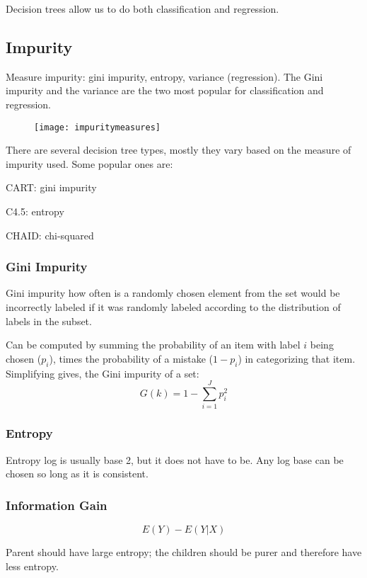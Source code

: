 Decision trees allow us to do both classification and regression.

	\subsection{Impurity}
Measure impurity: gini impurity, entropy, variance (regression).  The Gini impurity and the variance are the two most popular for classification and regression.

	\begin{figure}[tbp]
		\centering
		\texttt{[image: impuritymeasures]}
	\end{figure}

There are several decision tree types, mostly they vary based on the measure of impurity used.  Some popular ones are:
	\begin{bulletedlist}
		\item CART: gini impurity
		\item C4.5: entropy
		\item CHAID: chi-squared
	\end{bulletedlist}

	\subsubsection{Gini Impurity}
Gini impurity how often is a randomly chosen element from the set would be incorrectly labeled if it was randomly labeled according to the distribution of labels in the subset.

Can be computed by summing the probability of an item with label $i$ being chosen ($p_i$), times the probability of a mistake ($1-p_i$)
in categorizing that item.
Simplifying gives, the Gini impurity of a set:
	\begin{equation}
		G(k) = 1 - \sum_{i=1}^J p_i^2
	\end{equation}

	\subsubsection{Entropy}
Entropy log is usually base 2, but it does not have to be.  Any log base can be chosen so long as it is consistent.

	\subsubsection{Information Gain}
	\begin{equation}
		E(Y) - E(Y|X)
	\end{equation}
	\begin{mathwhere}[0.4in]
	\end{mathwhere}
Parent should have large entropy; the children should be purer and therefore have less entropy.

